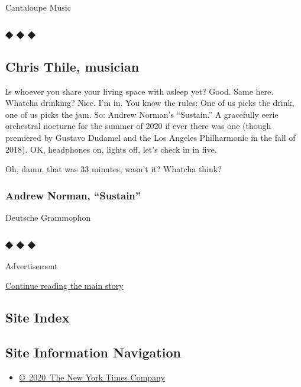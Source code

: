 Cantaloupe Music

\hypertarget{---17}{%
\subsubsection{◆ ◆ ◆}\label{---17}}

\hypertarget{chris-thile-musician}{%
\subsection{Chris Thile, musician}\label{chris-thile-musician}}

Is whoever you share your living space with asleep yet? Good. Same here.
Whatcha drinking? Nice. I'm in. You know the rules: One of us picks the
drink, one of us picks the jam. So: Andrew Norman's ``Sustain.'' A
gracefully eerie orchestral nocturne for the summer of 2020 if ever
there was one (though premiered by Gustavo Dudamel and the Los Angeles
Philharmonic in the fall of 2018). OK, headphones on, lights off, let's
check in in five.

Oh, damn, that was 33 minutes, wasn't it? Whatcha think?

\hypertarget{andrew-norman-sustain}{%
\subsubsection{Andrew Norman, ``Sustain''}\label{andrew-norman-sustain}}

Deutsche Grammophon

\hypertarget{---18}{%
\subsubsection{◆ ◆ ◆}\label{---18}}

Advertisement

\protect\hyperlink{after-bottom}{Continue reading the main story}

\hypertarget{site-index}{%
\subsection{Site Index}\label{site-index}}

\hypertarget{site-information-navigation}{%
\subsection{Site Information
Navigation}\label{site-information-navigation}}

\begin{itemize}
\tightlist
\item
  \href{https://help.nytimes3xbfgragh.onion/hc/en-us/articles/115014792127-Copyright-notice}{©~2020~The
  New York Times Company}
\end{itemize}

